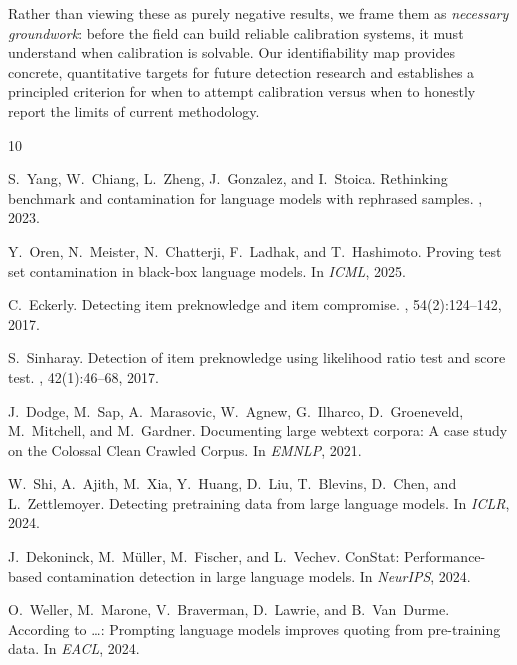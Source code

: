 \documentclass[letterpaper, 10pt, twocolumn]{article}
\begin{document}
Rather than viewing these as purely negative results, we frame them as \emph{necessary groundwork}: before the field can build reliable calibration systems, it must understand when calibration is solvable.
Our identifiability map provides concrete, quantitative targets for future detection research and establishes a principled criterion for when to attempt calibration versus when to honestly report the limits of current methodology.



\begin{thebibliography}{10}

S.~Yang, W.~Chiang, L.~Zheng, J.~Gonzalez, and I.~Stoica.
\newblock Rethinking benchmark and contamination for language models with rephrased samples.
, 2023.

Y.~Oren, N.~Meister, N.~Chatterji, F.~Ladhak, and T.~Hashimoto.
\newblock Proving test set contamination in black-box language models.
\newblock In {\em ICML}, 2025.

C.~Eckerly.
\newblock Detecting item preknowledge and item compromise.
, 54(2):124--142, 2017.

S.~Sinharay.
\newblock Detection of item preknowledge using likelihood ratio test and score test.
, 42(1):46--68, 2017.

J.~Dodge, M.~Sap, A.~Marasovic, W.~Agnew, G.~Ilharco, D.~Groeneveld, M.~Mitchell, and M.~Gardner.
\newblock Documenting large webtext corpora: A case study on the Colossal Clean Crawled Corpus.
\newblock In {\em EMNLP}, 2021.

W.~Shi, A.~Ajith, M.~Xia, Y.~Huang, D.~Liu, T.~Blevins, D.~Chen, and L.~Zettlemoyer.
\newblock Detecting pretraining data from large language models.
\newblock In {\em ICLR}, 2024.

J.~Dekoninck, M.~Müller, M.~Fischer, and L.~Vechev.
\newblock ConStat: Performance-based contamination detection in large language models.
\newblock In {\em NeurIPS}, 2024.

O.~Weller, M.~Marone, V.~Braverman, D.~Lawrie, and B.~Van~Durme.
\newblock According to \ldots: Prompting language models improves quoting from pre-training data.
\newblock In {\em EACL}, 2024.


\end{thebibliography}
\end{document}
